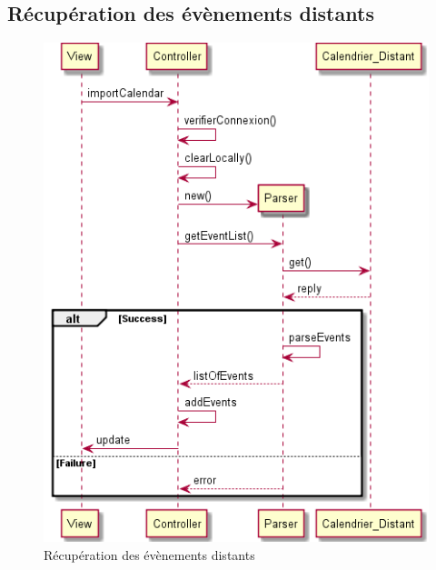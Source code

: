 		\subsection{Récupération des évènements distants}
			\begin{figure}[!h]
				\centering
				\includegraphics[scale=0.65]{diagseq_getEventList.png}
				\caption{Récupération des évènements distants}
			\end{figure}
			\FloatBarrier
			
